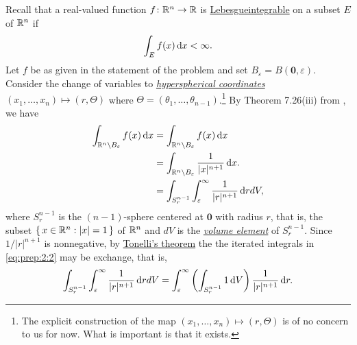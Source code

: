 \begin{solution}
Recall that a real-valued function $f\colon\mathbb{R}^n\to\mathbb{R}$ is
\href{https://en.wikipedia.org/wiki/Fubini's_theorem#Tonelli.27s_theorem_for_non-negative_functions}{Lebesgueintegrable}
on a subset $E$ of $\mathbb{R}^n$ if
\begin{equation}
\label{eq:prep:2:1}
\int_E f( x )\mathop{}\!\mathrm{d} x <\infty.
\end{equation}
Let $f$ be as given in the statement of the problem and set
$B_\varepsilon= B(\mathbf{0},\varepsilon)$. Consider
the change of variables to
\href{https://en.wikipedia.org/wiki/N-sphere#Spherical_coordinates}{\emph{hyperspherical
    coordinates}} $(x_1,\dotsc,x_n)\mapsto(r,\Theta)$ where
$\Theta=(\theta_1,\dotsc,\theta_{n-1})$.\footnote{The explicit construction
  of the map $(x_1,\dotsc,x_n)\mapsto(r,\Theta)$ is of no concern to us for
  now. What is important is that it exists.} By Theorem 7.26(iii) from
\cite[Ch.\@ 7, p.\@ 123]{rudin-2}, we have
\begin{equation}
\label{eq:prep:2:2}
\begin{aligned}
\int_{\mathbb{R}^n\setminus B_\varepsilon}f( x )\mathop{}\!\mathrm{d} x
&=\int_{\mathbb{R}^n\setminus B_\varepsilon} f( x )\mathop{}\!\mathrm{d} x \\
&=\int_{\mathbb{R}^n\setminus
  B_\varepsilon}\frac{1}{| x |^{n+1}}\mathop{}\!\mathrm{d} x .\\
&=\int_{S^{n-1}_r}\int_\varepsilon^\infty\frac{1}{|r|^{n+1}} \mathop{}\!\mathrm{d} r dV,
\end{aligned}
\end{equation}
where $S_r^{n-1}$ is the $(n-1)$-sphere centered at $\mathbf{0}$ with
radius $r$, that is, the subset $\left\{\, x \in\mathbb{R}^n:| x |=1\,\right\}$
of $\mathbb{R}^n$ and $dV$ is the
\href{https://en.wikipedia.org/wiki/Volume_element}{\emph{volume element}}
of $S_r^{n-1}$. Since $1/|r|^{n+1}$ is nonnegative, by
\href{https://en.wikipedia.org/wiki/Fubini's_theorem#Tonelli.27s_theorem}{Tonelli's
  theorem} the the iterated integrals in \eqref{eq:prep:2:2} may be
exchange, that is,
\begin{equation}
  \label{eq:prep:2:3}
\int_{S^{n-1}_r}\int_\varepsilon^\infty\frac{1}{|r|^{n+1}} \mathop{}\!\mathrm{d} r dV=
\int_\varepsilon^\infty\left(\int_{S_r^{n-1}}1\mathop{}\!\mathrm{d}
  V\right)\frac{1}{|r|^{n+1}}\mathop{}\!\mathrm{d} r.
\end{equation}


\end{solution}
